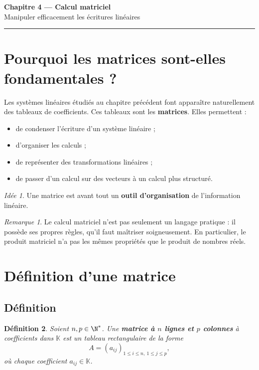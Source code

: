 \documentclass[11pt,a4paper]{article}
\newtheorem{definition}{Définition}[section]
\theoremstyle{remark}
\newtheorem{remarque}[definition]{Remarque}
\newtheorem*{idee}{Idée}
\newcommand{\K}{\mathbb{K}}
\begin{document}
\begin{center}
    {\LARGE \textbf{Chapitre 4 --- Calcul matriciel}}\\[0.5em]
    {\large Manipuler efficacement les écritures linéaires}
\end{center}

\hrule
\vspace{1em}

\tableofcontents

\newpage

\section{Pourquoi les matrices sont-elles fondamentales ?}

Les systèmes linéaires étudiés au chapitre précédent font apparaître naturellement des tableaux de coefficients. Ces tableaux sont les \textbf{matrices}. Elles permettent :
\begin{itemize}
    \item de condenser l’écriture d’un système linéaire ;
    \item d’organiser les calculs ;
    \item de représenter des transformations linéaires ;
    \item de passer d’un calcul sur des vecteurs à un calcul plus structuré.
\end{itemize}

\begin{idee}
Une matrice est avant tout un \textbf{outil d’organisation} de l’information linéaire.
\end{idee}

\begin{remarque}
Le calcul matriciel n’est pas seulement un langage pratique : il possède ses propres règles, qu’il faut maîtriser soigneusement. En particulier, le produit matriciel n’a pas les mêmes propriétés que le produit de nombres réels.
\end{remarque}

\section{Définition d’une matrice}

\subsection{Définition}

\begin{definition}
Soient \(n,p\in \N^\ast\).  
Une \textbf{matrice à \(n\) lignes et \(p\) colonnes} à coefficients dans \(\K\) est un tableau rectangulaire de la forme
\[
A=(a_{ij})_{1\le i\le n,\ 1\le j\le p},
\]
où chaque coefficient \(a_{ij}\in \K\).
\end{definition}
\end{document}
